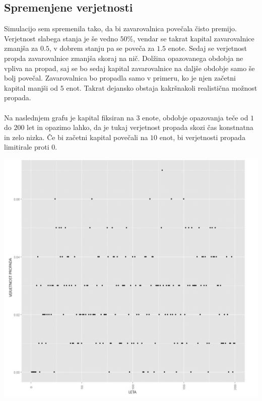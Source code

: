 \documentclass[a4paper,12pt]{homework}
\begin{document}
	\subsection{Spremenjene verjetnosti}
	Simulacijo sem spremenila tako, da bi zavarovalnica povečala čisto premijo. Verjetnost slabega stanja je še vedno $50\%$, vendar se takrat kapital zavarovalnice zmanjša za $0.5$, v dobrem stanju pa se poveča za $1.5$ enote. Sedaj se verjetnost propda zavarovalnice zmanjša skoraj na nič. Dolžina opazovanega obdobja ne vpliva na propad, saj se bo sedaj kapital zavarovalnice na daljše obdobje samo še bolj povečal. Zavarovalnica bo propadla samo v primeru, ko je njen začetni kapital manjši od $5$ enot. Takrat dejansko obstaja kakršnakoli realistična možnost propada.
	\\
	\\
	Na naslednjem grafu je kapital fiksiran na $3$ enote, obdobje opazovanja teče od $1$ do $200$ let in opazimo lahko, da je tukaj verjetnost propada skozi čas konstnatna in zelo nizka. Če bi začetni kapital povečali na $10$ enot, bi verjetnosti propada limitirale proti 0.
	
	\begin{center}
		\includegraphics[scale=0.32]{graf2.jpg}  
	\end{center}
	
	\newpage
\end{document}
